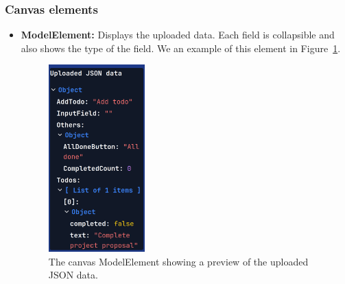 \subsubsection{Canvas elements}
\begin{itemize}
	\item \textbf{ModelElement:} Displays the uploaded data. Each field is collapsible and also shows the type of the field. We an example of this element in Figure~\ref{fig:model-menu}.
	      \begin{figure}[htbp]
		      \begin{center}
			      \includegraphics[width=0.35\textwidth]{img/json-menu.pdf}
		      \end{center}
		      \caption{The canvas ModelElement showing a preview of the uploaded JSON data.}\label{fig:model-menu}
	      \end{figure}


\end{itemize}
